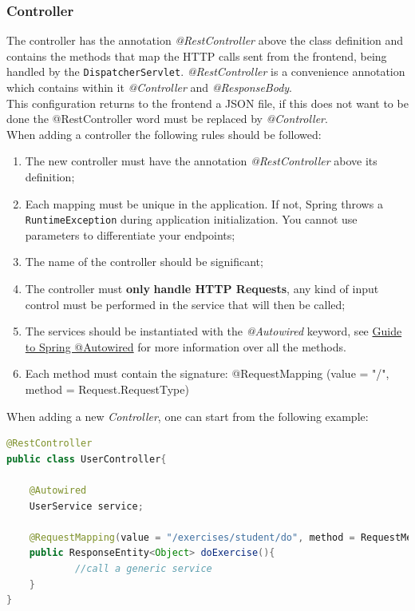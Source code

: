 \subsubsection{Controller}
The controller has the annotation \textit{@RestController} above the class definition and contains the methods that map the HTTP calls sent from the frontend, being handled by the \texttt{DispatcherServlet}. \textit{@RestController} is a convenience annotation which contains within it \textit{@Controller} and \textit{@ResponseBody}.\\
This configuration returns to the frontend a JSON file, if this does not want to be done the @RestController word must be replaced by \textit{@Controller}.\\
When adding a controller the following rules should be followed:
\begin{enumerate}
\item The new controller must have the annotation \textit{@RestController} above its definition;
\item Each mapping must be unique in the application. If not, Spring throws a \texttt{RuntimeException} during application initialization. You cannot use parameters to differentiate your endpoints;
\item The name of the controller should be significant;
\item The controller must \textbf{only} \textbf{handle HTTP Requests}, any kind of input control must be performed in the service that will then be called;
\item The services should be instantiated with the \textit{@Autowired} keyword, see \href{https://www.baeldung.com/spring-autowire}{Guide to Spring @Autowired} for more information over all the methods.
\item Each method must contain the signature: @RequestMapping (value = "/", method = Request.RequestType)
\end{enumerate}
When adding a new \textit{Controller}, one can start from the following example:
\begin{lstlisting}[language=Java]
@RestController
public class UserController{

	@Autowired
	UserService service; 
	
	@RequestMapping(value = "/exercises/student/do", method = RequestMethod.POST, produces = MediaType.APPLICATION_JSON_VALUE)
	public ResponseEntity<Object> doExercise(){
			//call a generic service
	}
}
\end{lstlisting}
